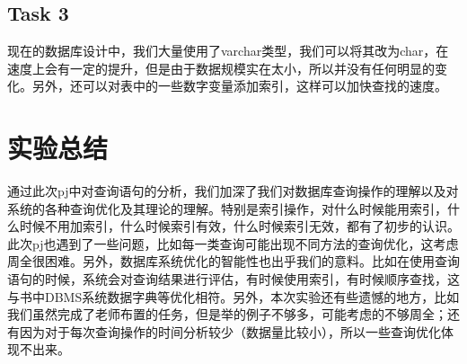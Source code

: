 \documentclass[a4paper, 11pt, nofonts, nocap, fancyhdr]{ctexart}
\begin{document}
\subsection{Task 3}

现在的数据库设计中，我们大量使用了varchar类型，我们可以将其改为char，在速度上会有一定的提升，但是由于数据规模实在太小，所以并没有任何明显的变化。另外，还可以对表中的一些数字变量添加索引，这样可以加快查找的速度。

\section{实验总结}

通过此次pj中对查询语句的分析，我们加深了我们对数据库查询操作的理解以及对系统的各种查询优化及其理论的理解。特别是索引操作，对什么时候能用索引，什么时候不用加索引，什么时候索引有效，什么时候索引无效，都有了初步的认识。此次pj也遇到了一些问题，比如每一类查询可能出现不同方法的查询优化，这考虑周全很困难。另外，数据库系统优化的智能性也出乎我们的意料。比如在使用查询语句的时候，系统会对查询结果进行评估，有时候使用索引，有时候顺序查找，这与书中DBMS系统数据字典等优化相符。另外，本次实验还有些遗憾的地方，比如我们虽然完成了老师布置的任务，但是举的例子不够多，可能考虑的不够周全；还有因为对于每次查询操作的时间分析较少（数据量比较小），所以一些查询优化体现不出来。
\end{document}
